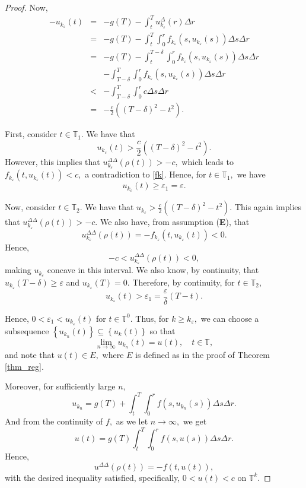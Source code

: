 \documentclass[10pt,a4paper]{amsart}
\begin{document}
\begin{proof}
	Now,
	\begin{eqnarray*}
		-u_{k_{\varepsilon}}(t) & = &-g(T)- \int_{t}^{T} u_{k_{\varepsilon}}^{\Delta}(r) \Delta r \\
		& = & -g(T)- \int_{t}^{T} \int_{0}^{r} f_{k_{\varepsilon}}(s, u_{k_{\varepsilon}}(s)) \Delta s \Delta r \\
		& = & -g(T)- \int_{t}^{T-\delta} \int_{0}^{r} f_{k_{\varepsilon}}(s, u_{k_{\varepsilon}}(s)) \Delta s \Delta r \\
		&   & - \int_{T-\delta}^{T} \int_{0}^{r} f_{k_{\varepsilon}}(s, u_{k_{\varepsilon}}(s)) \Delta s \Delta r \\
		& < & - \int_{T-\delta}^{T} \int_{0}^{r} c \Delta s \Delta r \\
		& = & - \frac{c}{2} \left((T-\delta)^2 - t^2\right).
	\end{eqnarray*}
	
	First, consider $t \in \mathbb{T}_1.$  We have that $$u_{k_{\varepsilon}}(t) > \frac{c}{2} \left((T-\delta)^2 - t^2\right).$$  However, this implies that $u_{k_{\varepsilon}}^{\Delta\Delta}(\rho(t)) > -c,$ which leads to $f_{k_{\varepsilon}}(t, u_{k_{\varepsilon}}(t)) < c,$ a contradiction to \eqref{fk}.  Hence, for $t \in \mathbb{T}_1,$ we have $$u_{k_{\varepsilon}}(t) \geq \varepsilon_1 = \varepsilon.$$
	
	Now, consider $t \in \mathbb{T}_2.$  We have that $u_{k_{\varepsilon}} > \frac{c}{2} \left((T-\delta)^2 - t^2\right).$  This again implies that $u_{k_{\varepsilon}}^{\Delta\Delta}(\rho(t)) > -c.$  We also have, from assumption (\textbf{E}), that $$u_{k_{\varepsilon}}^{\Delta\Delta}(\rho(t)) = - f_{k_{\varepsilon}}(t, u_{k_{\varepsilon}}(t)) < 0.$$  Hence, $$-c < u_{k_{\varepsilon}}^{\Delta\Delta}(\rho(t)) < 0,$$ making $u_{k_{\varepsilon}}$ concave in this interval.  We also know, by continuity, that $u_{k_{\varepsilon}}(T-\delta) \geq \varepsilon$ and $u_{k_{\varepsilon}}(T) = 0.$  Therefore, by continuity, for $t \in \mathbb{T}_2,$ $$u_{k_{\varepsilon}}(t) > \varepsilon_1 = \frac{\varepsilon}{\delta} (T-t).$$
	
	Hence, $0 < \varepsilon_1 < u_{k_{\varepsilon}}(t)$ for $t \in \mathbb{T}^0.$
	Thus, for $k \geq k_{\varepsilon},$ we can choose a subsequence $\left\{u_{k_{n}}(t)\right\} \subseteq \left\{u_{k}(t)\right\}$ so that $$\lim\limits_{n \rightarrow \infty} u_{k_{n}}(t) = u(t), \quad t \in \mathbb{T},$$ and note that $u(t) \in E,$ where $E$ is defined as in the proof of Theorem \ref{thm_reg}.
     
    Moreover, for sufficiently large $n,$ $$u_{k_{n}} = g(T)+\int_{t}^{T} \int_{0}^{r} f(s, u_{k_{n}}(s)) \Delta s \Delta r.$$  And from the continuity of $f,$ as we let $n \rightarrow \infty,$ we get $$u(t) =g(T)\int_{t}^{T} \int_{0}^{r} f(s, u(s)) \Delta s \Delta r.$$  Hence, $$u^{\Delta\Delta}(\rho(t)) = -f(t, u(t)),$$ with the desired inequality satisfied, specifically, $0 < u(t) < c$ on $\mathbb{T}^k.$

\end{proof}
\end{document}
